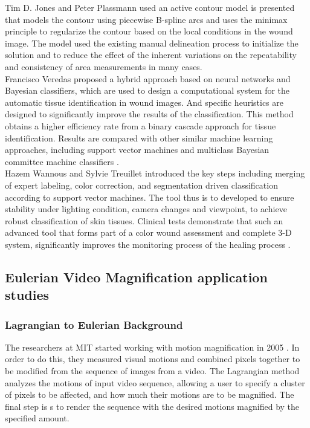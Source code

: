 Tim D. Jones and Peter Plassmann used an active contour model is presented that models the contour using piecewise B-spline arcs and uses the minimax principle
to regularize the contour based on the local conditions in the wound image. The model used the existing manual delineation process to initialize the solution and to reduce the effect of the inherent variations on the repeatability and consistency of area measurements in many cases.\cite{Jones}\\

Francisco Veredas proposed a hybrid approach based on neural networks and Bayesian
classifiers, which are used to design a computational system for the automatic tissue identification in wound images. And specific heuristics are designed to significantly improve the results of the classification. This method obtains a higher efficiency rate from a binary cascade approach for tissue identification. Results are compared with other similar machine learning approaches, including support vector machines and multiclass Bayesian committee machine classifiers  \cite{Veredas2}. \\

Hazem Wannous and Sylvie Treuillet introduced the key steps including merging of expert labeling, color correction, and segmentation driven classification according to support vector machines. The tool thus is to developed to ensure stability under lighting condition, camera changes and viewpoint, to achieve robust classification of skin tissues. Clinical tests demonstrate that such an advanced tool that forms part of a color wound assessment and complete 3-D system, significantly improves the monitoring process
of the healing process \cite{Wannous}.\\

\subsection{Eulerian Video Magnification application studies}
\subsubsection{Lagrangian to Eulerian Background}

The researchers at MIT started working with motion magnification in 2005 \cite{Motion}. In order to do this, they measured visual motions and combined pixels together to be modified from the sequence of images from a video. The Lagrangian method analyzes the motions of input video sequence, allowing a user to specify a cluster of pixels to be affected, and how much their motions are to be magnified. The final step is s to render the sequence with the desired motions magnified by the specified amount.\\

